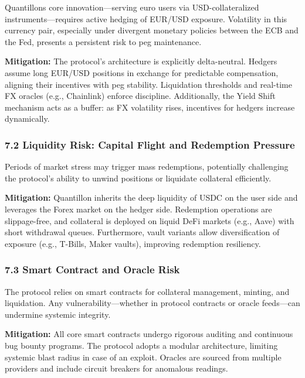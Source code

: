 Quantillon\textquotesingle s core innovation---serving euro users via
USD-collateralized instruments---requires active hedging of EUR/USD
exposure. Volatility in this currency pair, especially under divergent
monetary policies between the ECB and the Fed, presents a persistent
risk to peg maintenance.

\textbf{Mitigation:} The protocol's architecture is explicitly
delta-neutral. Hedgers assume long EUR/USD positions in exchange for
predictable compensation, aligning their incentives with peg stability.
Liquidation thresholds and real-time FX oracles (e.g., Chainlink)
enforce discipline. Additionally, the Yield Shift mechanism acts as a
buffer: as FX volatility rises, incentives for hedgers increase
dynamically.

\hypertarget{liquidity-risk-capital-flight-and-redemption-pressure}{%
\subsubsection{7.2 Liquidity Risk: Capital Flight and Redemption
Pressure}\label{liquidity-risk-capital-flight-and-redemption-pressure}}

Periods of market stress may trigger mass redemptions, potentially
challenging the protocol's ability to unwind positions or liquidate
collateral efficiently.

\textbf{Mitigation:} Quantillon inherits the deep liquidity of USDC on
the user side and leverages the Forex market on the hedger side.
Redemption operations are slippage-free, and collateral is deployed on
liquid DeFi markets (e.g., Aave) with short withdrawal queues.
Furthermore, vault variants allow diversification of exposure (e.g.,
T-Bills, Maker vaults), improving redemption resiliency.

\hypertarget{smart-contract-and-oracle-risk}{%
\subsubsection{7.3 Smart Contract and Oracle
Risk}\label{smart-contract-and-oracle-risk}}

The protocol relies on smart contracts for collateral management,
minting, and liquidation. Any vulnerability---whether in protocol
contracts or oracle feeds---can undermine systemic integrity.

\textbf{Mitigation:} All core smart contracts undergo rigorous auditing
and continuous bug bounty programs. The protocol adopts a modular
architecture, limiting systemic blast radius in case of an exploit.
Oracles are sourced from multiple providers and include circuit breakers
for anomalous readings.

